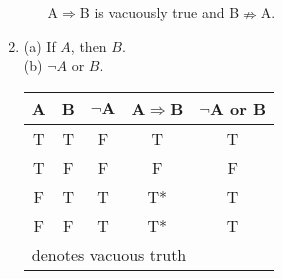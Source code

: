 \documentclass{article}
\begin{document}
\begin{enumerate}[label=(4.\arabic*),start=1]
\begin{enumerate}[label=(Condition \arabic*.),start=1]
                  A$\Rightarrow$B is vacuously true and B$\nRightarrow$A.
        \end{enumerate}
    \item (a) If $A$, then $B$. \\
          (b) $\neg$$A$ or $B$. \\
        \begin{center}
          \begin{tabular}{c|c|c||c||c}
            \textbf{A} & \textbf{B} & \textbf{$\neg\textbf{A}$} & \textbf{A$\Rightarrow$B} & \textbf{$\neg$A or B} \\\hline
            T & T & F & T & T \\\hline
            T & F & F & F & F \\\hline
            F & T & T & \hspace{2mm}T* & T \\\hline
            F & F & T & \hspace{2mm}T* & T \\\hline
            \multicolumn{5}{l}{\footnotesize * denotes vacuous truth}
          \end{tabular}
        \end{center}


\end{enumerate}
\end{document}
